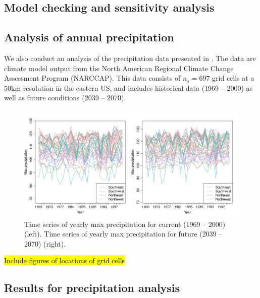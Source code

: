 \documentclass[11pt]{article}
\begin{document}
\subsection{Model checking and sensitivity analysis}

\subsection{Analysis of annual precipitation}\label{ebs:precip}
We also conduct an analysis of the precipitation data presented in \citep{Reich2012}.
The data are climate model output from the North American Regional Climate Change Assessment Program (NARCCAP).
This data consists of $n_s = 697$ grid cells at a 50km resolution in the eastern US, and includes historical data (1969 -- 2000) as well as future conditions (2039 -- 2070).

\begin{figure}  %
  \centering
  \includegraphics[width=\linewidth]{plots/precip-ts}
  \caption{Time series of yearly max precipitation for current (1969 -- 2000) (left). Time series of yearly max precipitation for future (2039 -- 2070) (right).}
  \label{ebf:tsprecip}
\end{figure}

\hl{Include figures of locations of grid cells}

\subsection{Results for precipitation analysis}\label{ebs:results-precip}
\end{document}
